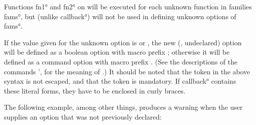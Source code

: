 \documentclass[
  use-a4-paper,
  use-10pt-font,
  final-version,
  use-UK-English,
  fancy-section-headings,
  frame-section-numbers,
  para-abstract-style,
  input-config-file,
  no-hyperref-messages
]{amltxdoc}
\begin{document}
\ltsnote Functions \ang{fn1} and \ang{fn2} on  will be executed for each unknown function in families \ang{fams}, but (unlike \ang{callback}) will not be used in defining unknown options of \ang{fams}.

If the value given for the unknown option is  or , the new (\ie, undeclared) option will be defined as a boolean option with macro prefix ; otherwise it will be defined as a command option with macro prefix . (See the descriptions of the commands \ffx'{\XDeclareCommandOption,\XDeclareBooleanOption} for the meaning of .) It should be noted that the token  in the above syntax is not escaped, and that the token  is mandatory. If \ang{callback} contains these literal forms, they have to be enclosed in curly braces.

The following example, among other things, produces a warning when the user supplies an option that was not previously declared:
\end{document}
